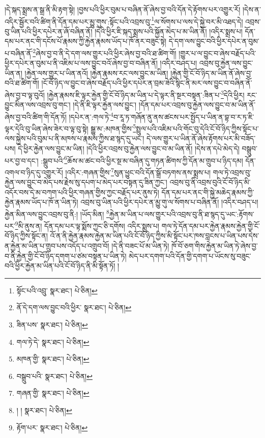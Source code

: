 །དེ་སྐད་སྨྲས་ན་སྒྲ་ནི་མི་རྟག་སྟེ། །བྱས་པའི་ཕྱིར་བུམ་པ་བཞིན་ནོ་ཞེས་བྱ་བའི་དོན་དེ་རྟོགས་པར་འགྱུར་རོ། །དེས་ན་འདིར་སྦྱོར་བའི་ཚིག་ནི་དོན་དམ་པར་མྱུ་གུས་:སྟོང་པའི་འབྲས་བུ་\footnote{སྟོང་པའི་འབྲུ་  སྣར་ཐང་།  པེ་ཅིན། }ལ་སོགས་པ་ལས་དེ་སྐྱེ་བར་མི་འཐད་དེ། འབྲས་བུ་ཡིན་པའི་ཕྱིར་དཔེར་ན་ཞོ་བཞིན་ནོ། །དེའི་ཕྱིར་ཇི་སྐད་སྨྲས་པའི་སྐྱོན་མེད་པ་མ་ཡིན་ནོ། །འདིར་སྨྲས་པ། དོན་དམ་པར་ནང་གི་དངོས་པོ་རྣམས་ཀྱི་རྐྱེན་རྣམས་ཡོད་པ་ཁོ་ནར་བཟུང་སྟེ། དེ་དག་ལས་བྱུང་བའི་ཕྱིར་དཔེར་ན་བུམ་པ་བཞིན་ནོ་\footnote{ནོ་དེ་དག་ལས་བྱུང་བའི་ཕྱིར་  སྣར་ཐང་།  པེ་ཅིན། }ཞེས་བྱ་བ་ནི་དེ་དག་ལས་གྱུར་པའི་ཕྱིར་ཞེས་བྱ་བའི་ཐ་ཚིག་གོ། །གྱུར་པ་ལ་བྱུང་བ་ཞེས་བརྗོད་པའི་ཕྱིར་དཔེར་ན་བུམ་པ་ནི་འཇིམ་པ་ལས་བྱུང་བའོ་ཞེས་བྱ་བ་བཞིན་ནོ། །འདིར་བཤད་པ། འབྲས་བུ་རྐྱེན་ལས་བྱུང་ཡིན་ན། །རྐྱེན་ལས་གྱུར་པ་ཡིན་ནའོ། །རྐྱེན་རྣམས་རང་ལས་བྱུང་མ་ཡིན། །རྐྱེན་གྱི་ངོ་བོ་ཉིད་མ་ཡིན་ནོ་ཞེས་བྱ་བའི་ཐ་ཚིག་གོ། །ངོ་བོ་ཉིད་ལ་བྱུང་བ་ཞེས་བརྗོད་པའི་ཕྱིར་དཔེར་ན་བྲམ་ཟེའི་སྙིང་ནི་མར་ལས་བྱུང་བ་བཞིན་ནོ་ཞེས་བྱ་བ་ལྟ་བུའོ། །རྐྱེན་རྣམས་ཇི་ལྟར་རྐྱེན་གྱི་ངོ་བོ་ཉིད་མ་ཡིན་པ་དེ་ལྟར་ནི་སྔར་བསྟན་:ཟིན་པ་\footnote{ཟིན་པས་  སྣར་ཐང་།  པེ་ཅིན། }དེའི་ཕྱིར། རང་བྱུང་མིན་ལས་འབྲས་བུ་གང་། །དེ་ནི་ཇི་ལྟར་རྐྱེན་ལས་བྱུང་། །དོན་དམ་པར་འབྲས་བུ་རྐྱེན་ལས་བྱུང་བ་མ་ཡིན་ནོ་ཞེས་བྱ་བའི་ཚིག་གི་དོན་ཏོ། །དཔེར་ན་:གལ་ཏེ་\footnote{གལ་ཏེ་དེ་  སྣར་ཐང་།  པེ་ཅིན། }བ་རཱ་ཏ་གཞོན་ནུ་ནས་ཚངས་པར་སྤྱོད་པ་ཡིན་ན་བྷ་བ་ར་ཏ་ཇི་ལྟར་དེའི་བུ་ཡིན་ཞེས་ཟེར་བ་ལྟ་བུ་སྟེ། སྒྱུ་མ་:མཁན་གྱིས་\footnote{མཁན་གྱི་  སྣར་ཐང་།  པེ་ཅིན། }སྤྲུལ་པའི་འཇིམ་པའི་གོང་བུ་དེའི་ངོ་བོ་ཉིད་ཀྱིས་སྟོང་པ་ལས་སྐྱེས་པའི་བུམ་པ་ནི་མཁས་པ་རྣམས་ཀྱིས་ཐ་སྙད་དུ་ཡང་། དེ་ལས་གྱུར་པ་ཡིན་ནོ་ཞེས་རྟོགས་པར་མི་བཟོད་པས། དེ་ཕྱིར་རྐྱེན་ལས་བྱུང་མ་ཡིན། །དེའི་ཕྱིར་འབྲས་བུ་རྐྱེན་ལས་བྱུང་བ་མ་ཡིན་ནོ། །དེས་ན་དཔེ་མེད་དེ། བསྒྲུབ་པར་བྱ་བ་དང་། :སྒྲུབ་པའི་\footnote{བསྒྲུབ་པའི་  སྣར་ཐང་།  པེ་ཅིན། }ཆོས་མ་ཚང་བའི་ཕྱིར་སྔ་མ་བཞིན་དུ་གཏན་ཚིགས་ཀྱི་དོན་མ་གྲུབ་པ་ཉིད་དམ། དོན་འགལ་བ་ཉིད་དུ་འགྱུར་རོ། །འདིར་:གཞན་གྱིས་\footnote{གཞན་གྱི་  སྣར་ཐང་།  པེ་ཅིན། }སུན་ཕྱུང་བའི་དོན་སྒྲོ་བཏགས་ནས་སྨྲས་པ། གལ་ཏེ་འབྲས་བུ་རྐྱེན་ལས་བྱུང་བ་མེད་པས་རྗེས་སུ་དཔག་པ་མེད་པར་བསྟན་དུ་ཟིན་ཀྱང་། འབྲས་བུ་ནི་འབྲས་བུའི་ངོ་བོ་ཉིད་མི་འདོར་བས་དེ་མ་བཀག་པའི་ཕྱིར་གཞན་གྱིས་ཀྱང་བརྗོད་པར་ནུས་ཏེ། དོན་དམ་པར་ནང་གི་སྐྱེ་མཆེད་རྣམས་ཀྱི་རྐྱེན་རྣམས་ཡོད་པ་ཁོ་ན་ཡིན་ཏེ། འབྲས་བུ་ཡིན་པའི་ཕྱིར་དཔེར་ན་མྱུ་གུ་ལ་སོགས་པ་བཞིན་ནོ། །འདིར་བཤད་པ། རྐྱེན་མིན་ལས་བྱུང་འབྲས་བུ་ནི:། །ཡོད་མིན། \footnote{། །   སྣར་ཐང་།  པེ་ཅིན། }རྐྱེན་མ་ཡིན་པ་ལས་གྱུར་པའི་འབྲས་བུ་ནི་ཐ་སྙད་དུ་ཡང་:རྟོགས་པར་\footnote{རྟོག་པར་  སྣར་ཐང་།  པེ་ཅིན། }མི་ནུས་ན། དོན་དམ་པར་ལྟ་སྨོས་ཀྱང་ཅི་དགོས། འདིར་སྨྲས་པ། གལ་ཏེ་དོན་དམ་པར་རྐྱེན་རྣམས་རྐྱེན་གྱི་ངོ་བོ་ཉིད་ཀྱིས་སྟོང་ན། འོ་ན་ནི་རྐྱེན་རྣམས་རྐྱེན་མ་ཡིན་པའི་ངོ་བོ་ཉིད་ཀྱིས་མི་སྟོང་པར་ཁས་བླངས་པ་ཡིན་པས་དེས་ན་རྐྱེན་མ་ཡིན་པ་གྲུབ་པས་འདོད་པ་འགྲུབ་བོ། །དེ་ནི་བཟང་པོ་མ་ཡིན་ཏེ། ཁོ་བོ་ཅག་གིས་རྐྱེན་མ་ཡིན་ཏེ་ཞེས་བྱ་བ་ནི་རྐྱེན་གྱི་ངོ་བོ་ཉིད་དགག་པ་ཙམ་བསྟན་པ་ཡིན་ཏེ། མེད་པར་དགག་པའི་དོན་གྱི་དགག་པ་ཡོངས་སུ་བཟུང་བའི་ཕྱིར་རྐྱེན་མ་ཡིན་པའི་ངོ་བོ་ཉིད་ནི་མི་སྟོན་ཏོ། །

